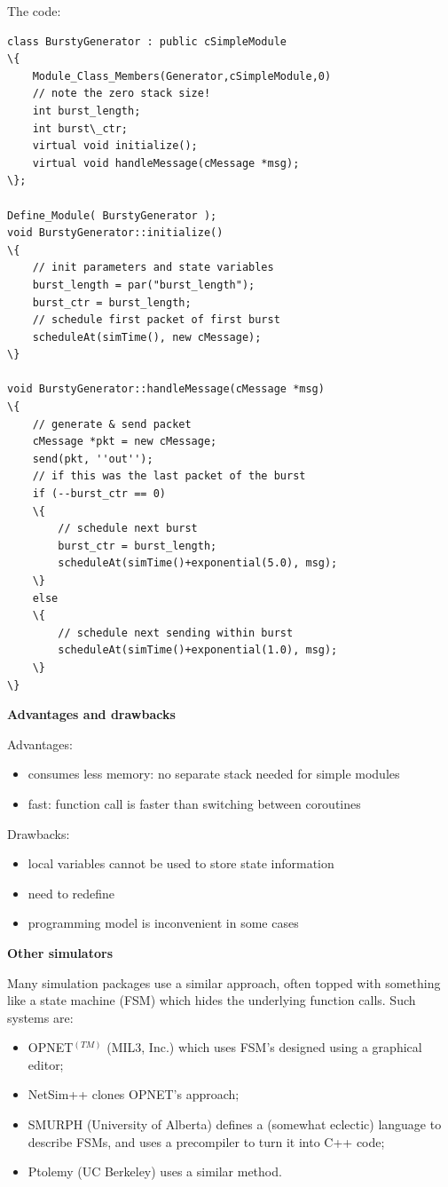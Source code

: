 The code:


\begin{Verbatim}[commandchars=\\\{\}]
class BurstyGenerator : public cSimpleModule
\{
    Module_Class_Members(Generator,cSimpleModule,0)
    // note the zero stack size!
    int burst_length;
    int burst\_ctr;
    virtual void initialize();
    virtual void handleMessage(cMessage *msg);
\};

Define_Module( BurstyGenerator );
void BurstyGenerator::initialize()
\{
    // init parameters and state variables
    burst_length = par("burst_length");
    burst_ctr = burst_length;
    // schedule first packet of first burst
    scheduleAt(simTime(), new cMessage);
\}

void BurstyGenerator::handleMessage(cMessage *msg)
\{
    // generate & send packet
    cMessage *pkt = new cMessage;
    send(pkt, ''out'');
    // if this was the last packet of the burst
    if (--burst_ctr == 0)
    \{
        // schedule next burst
        burst_ctr = burst_length;
        scheduleAt(simTime()+exponential(5.0), msg);
    \}
    else
    \{
        // schedule next sending within burst
        scheduleAt(simTime()+exponential(1.0), msg);
    \}
\}
\end{Verbatim}



\textbf{Advantages and drawbacks}


Advantages:
\begin{itemize}
\item{consumes less memory: no separate stack needed for
    simple modules}
\item{fast: function call is faster than switching between coroutines}
\end{itemize}


Drawbacks:
\begin{itemize}
\item{local variables cannot be used to store state information}
\item{need to redefine }
\item{programming model is inconvenient in some cases}
\end{itemize}

\textbf{Other simulators}


Many simulation packages use a similar approach, often topped with
something like a state machine
(FSM) which hides the underlying function calls. Such
systems are:
\begin{itemize}
  \item{OPNET$^{(TM)}$ (MIL3, Inc.) which uses FSM's designed using a graphical editor;}
  \item{NetSim++ clones OPNET's approach;}
  \item{SMURPH (University of Alberta) defines a (somewhat eclectic)
      language to describe FSMs, and uses a precompiler to turn it
      into C++ code;}
  \item{Ptolemy (UC Berkeley) uses a similar method.}
\end{itemize}


